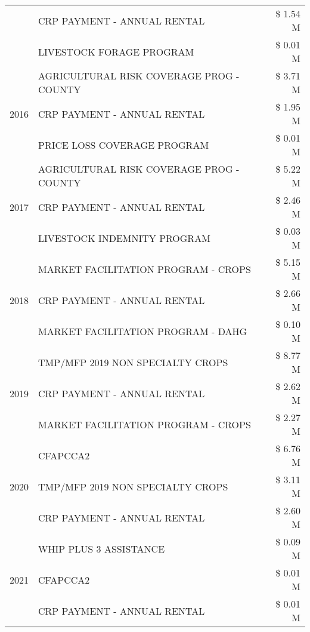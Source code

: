\begin{tabular}{llr}
 & CRP PAYMENT - ANNUAL RENTAL & \$ 1.54 M \\
 & LIVESTOCK FORAGE PROGRAM & \$ 0.01 M \\
\cline{1-3}
\multirow[t]{3}{*}{2016} & AGRICULTURAL RISK COVERAGE PROG - COUNTY & \$ 3.71 M \\
 & CRP PAYMENT - ANNUAL RENTAL & \$ 1.95 M \\
 & PRICE LOSS COVERAGE PROGRAM & \$ 0.01 M \\
\cline{1-3}
\multirow[t]{3}{*}{2017} & AGRICULTURAL RISK COVERAGE PROG - COUNTY & \$ 5.22 M \\
 & CRP PAYMENT - ANNUAL RENTAL & \$ 2.46 M \\
 & LIVESTOCK INDEMNITY PROGRAM & \$ 0.03 M \\
\cline{1-3}
\multirow[t]{3}{*}{2018} & MARKET FACILITATION PROGRAM - CROPS & \$ 5.15 M \\
 & CRP PAYMENT - ANNUAL RENTAL & \$ 2.66 M \\
 & MARKET FACILITATION PROGRAM - DAHG & \$ 0.10 M \\
\cline{1-3}
\multirow[t]{3}{*}{2019} & TMP/MFP 2019 NON SPECIALTY CROPS & \$ 8.77 M \\
 & CRP PAYMENT - ANNUAL RENTAL & \$ 2.62 M \\
 & MARKET FACILITATION PROGRAM - CROPS & \$ 2.27 M \\
\cline{1-3}
\multirow[t]{3}{*}{2020} & CFAPCCA2 & \$ 6.76 M \\
 & TMP/MFP 2019 NON SPECIALTY CROPS & \$ 3.11 M \\
 & CRP PAYMENT - ANNUAL RENTAL & \$ 2.60 M \\
\cline{1-3}
\multirow[t]{3}{*}{2021} & WHIP PLUS 3 ASSISTANCE & \$ 0.09 M \\
 & CFAPCCA2 & \$ 0.01 M \\
 & CRP PAYMENT - ANNUAL RENTAL & \$ 0.01 M \\
\cline{1-3}
\bottomrule
\end{tabular}

